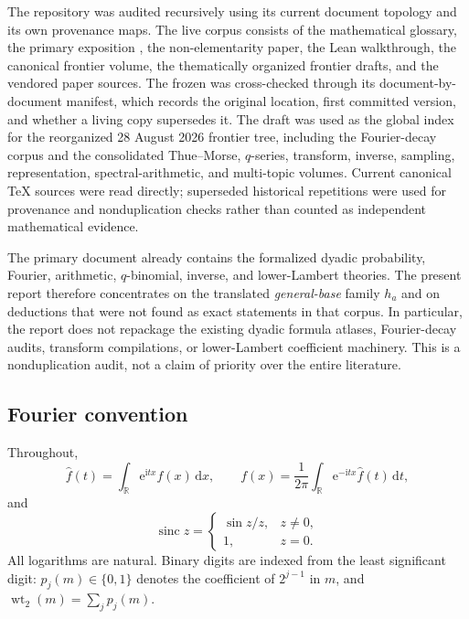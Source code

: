 \documentclass[11pt,oneside]{article}
\theoremstyle{definition}
\theoremstyle{remark}
\newcommand{\R}{\mathbb R}
\newcommand{\sinc}{\operatorname{sinc}}
\newcommand{\e}{\mathrm e}
\newcommand{\ii}{\mathrm i}
\newcommand{\dd}{\,\mathrm d}
\newcommand{\wt}{\operatorname{wt}_2}
\begin{document}
The repository was audited recursively using its current document topology and its own
provenance maps.  The live corpus consists of the mathematical glossary, the primary exposition
, the
non-elementarity paper, the Lean walkthrough, the canonical frontier volume, the thematically
organized frontier drafts, and the vendored paper sources.  The frozen  was
cross-checked through its document-by-document manifest, which records the original location,
first committed version, and whether a living copy supersedes it.  The draft 
was used as the global index for the reorganized 28 August 2026 frontier tree, including the
Fourier-decay corpus and the consolidated Thue--Morse, $q$-series, transform, inverse, sampling,
representation, spectral-arithmetic, and multi-topic volumes.  Current canonical TeX sources
were read directly; superseded historical repetitions were used for provenance and
nonduplication checks rather than counted as independent mathematical evidence.

The primary document already contains the formalized dyadic probability, Fourier, arithmetic,
$q$-binomial, inverse, and lower-Lambert theories.  The present report therefore concentrates on
the translated \emph{general-base} family $h_a$ and on deductions that were not found as exact
statements in that corpus.  In particular, the report does not repackage the existing dyadic
formula atlases, Fourier-decay audits, transform compilations, or lower-Lambert coefficient
machinery.  This is a nonduplication audit, not a claim of priority over the entire literature.

\subsection{Fourier convention}

Throughout,
\begin{equation}
 \widehat f(t)=\int_{\R}\e^{\ii tx}f(x)\dd x,
 \qquad
 f(x)=\frac1{2\pi}\int_{\R}\e^{-\ii tx}\widehat f(t)\dd t,
 \label{eq:fourier-convention}
\end{equation}
and
\[
 \sinc z=\begin{cases}\sin z/z,&z\ne0,\\1,&z=0.\end{cases}
\]
All logarithms are natural.  Binary digits are indexed from the least significant digit:
$p_j(m)\in\{0,1\}$ denotes the coefficient of $2^{j-1}$ in $m$, and
$\wt(m)=\sum_jp_j(m)$.
\end{document}
